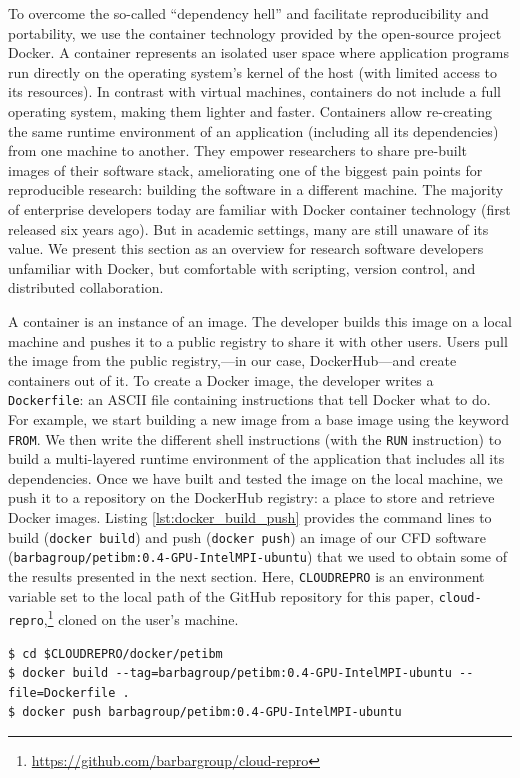 \documentclass[10pt,journal,compsoc]{IEEEtran}
\begin{document}
To overcome the so-called ``dependency hell'' and facilitate reproducibility and portability, we use the container technology provided by the open-source project Docker.
A container represents an isolated user space where application programs run directly on the operating system's kernel of the host (with limited access to its resources).
In contrast with virtual machines, containers do not include a full operating system, making them lighter and faster.
Containers allow re-creating the same runtime environment of an application (including all its dependencies) from one machine to another. 
They empower researchers to share pre-built images of their software stack, ameliorating one of the biggest pain points for reproducible research: building the software in a different machine. 
The majority of enterprise developers today are familiar with Docker container technology (first released six years ago). 
But in academic settings, many are still unaware of its value. 
We present this section as an overview for research software developers unfamiliar with Docker, but comfortable with scripting, version control, and distributed collaboration.

A container is an instance of an image.
The developer builds this image on a local machine and pushes it to a public registry to share it with other users.
Users pull the image from the public registry,---in our case, DockerHub---and create containers out of it.
To create a Docker image, the developer writes a \texttt{Dockerfile}: an ASCII file containing instructions that tell Docker what to do.
For example, we start building a new image from a base image using the keyword \texttt{FROM}.
We then write the different shell instructions (with the \texttt{RUN} instruction) to build a multi-layered runtime environment of the application that includes all its dependencies.
Once we have built and tested the image on the local machine, we push it to a repository on the DockerHub registry: a place to store and retrieve Docker images.
Listing \ref{lst:docker_build_push} provides the command lines to build (\texttt{docker build}) and push (\texttt{docker push}) an image of our CFD software (\texttt{barbagroup/petibm:0.4-GPU-IntelMPI-ubuntu}) that we used to obtain some of the results presented in the next section.
Here, \texttt{CLOUDREPRO} is an environment variable set to the local path of the GitHub repository for this paper, \texttt{cloud-repro},\footnote{\url{https://github.com/barbargroup/cloud-repro}} cloned on the user's machine.

\begin{lstlisting}[label=lst:docker_build_push,caption={Build and push a Docker image.}]
$ cd $CLOUDREPRO/docker/petibm
$ docker build --tag=barbagroup/petibm:0.4-GPU-IntelMPI-ubuntu --file=Dockerfile .
$ docker push barbagroup/petibm:0.4-GPU-IntelMPI-ubuntu
\end{lstlisting}
\end{document}
